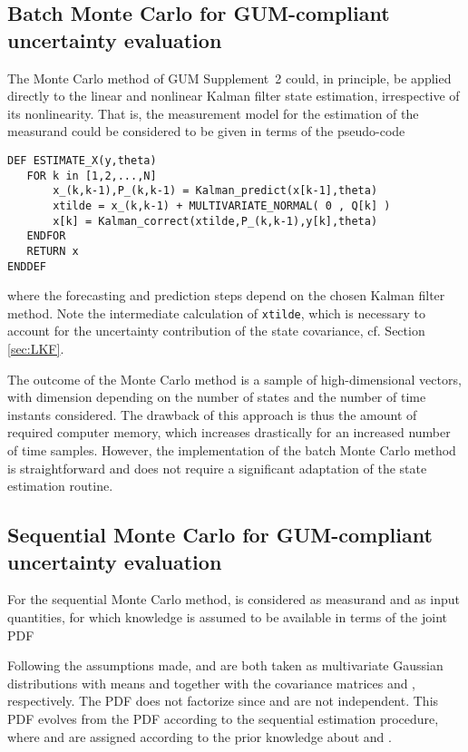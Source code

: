 \documentclass[10pt]{article}
\begin{document}
\begin{spacing}{1}
\subsection{Batch Monte Carlo for GUM-compliant uncertainty evaluation}
\label{sec:batchMC}
The Monte Carlo method of GUM Supplement~2 \cite{GUMS2} could, in principle, be applied directly to the linear and nonlinear Kalman filter state estimation, irrespective of its nonlinearity. That is, the measurement model for the estimation of the measurand  could be considered to be given in terms of the pseudo-code
\begin{verbatim}
DEF ESTIMATE_X(y,theta)
   FOR k in [1,2,...,N]
       x_(k,k-1),P_(k,k-1) = Kalman_predict(x[k-1],theta)
       xtilde = x_(k,k-1) + MULTIVARIATE_NORMAL( 0 , Q[k] )
       x[k] = Kalman_correct(xtilde,P_(k,k-1),y[k],theta)
   ENDFOR
   RETURN x
ENDDEF
\end{verbatim}
where the forecasting and prediction steps depend on the chosen Kalman filter method. Note the intermediate calculation of \verb!xtilde!, which is necessary to account for the uncertainty contribution of the state covariance, cf. Section \ref{sec:LKF}. 

The outcome of the Monte Carlo method is a sample of high-dimensional vectors, with dimension depending on the number of states and the number of time instants considered. The drawback of this approach is thus the amount of required computer memory, which increases drastically for an increased number of time samples. However, the implementation of the batch Monte Carlo method is straightforward and does not require a significant adaptation of the state estimation routine. 

\subsection{Sequential Monte Carlo for GUM-compliant uncertainty evaluation}
For the sequential Monte Carlo method,  is considered as measurand and  as input quantities, for which knowledge is assumed to be available in terms of the joint PDF 

Following the assumptions made,  and  are both taken as multivariate Gaussian distributions with means  and  together with the covariance matrices  and , respectively.
The PDF  does not factorize since  and 
are not independent. This PDF evolves from the PDF  according to the sequential estimation procedure, where  and  are assigned according to the prior knowledge about  and .


\end{spacing}
\end{document}
